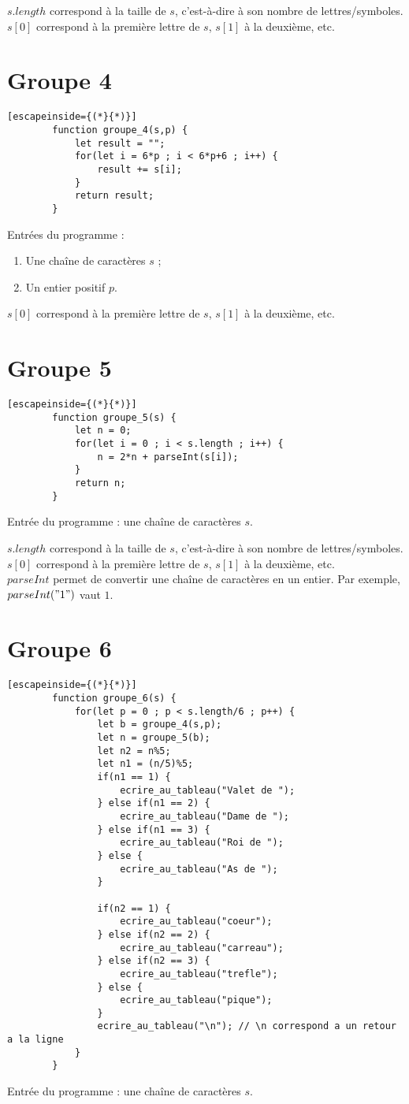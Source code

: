 \documentclass{article}
\begin{document}
	\vspace{1em}
	\noindent $s.length$ correspond à la taille de $s$, c'est-à-dire à son nombre de lettres/symboles. $s[0]$ correspond à la première lettre de $s$, $s[1]$ à la deuxième, etc.
	
	\newpage
	\section*{Groupe 4}
	\begin{lstlisting}[escapeinside={(*}{*)}]
		function groupe_4(s,p) {
			let result = "";
			for(let i = 6*p ; i < 6*p+6 ; i++) {
				result += s[i];
			}
			return result;
		}
	\end{lstlisting}
	Entrées du programme :
	\begin{enumerate}
		\item Une chaîne de caractères $s$ ;
		\item Un entier positif $p$.
	\end{enumerate}
	
	\vspace{1em}
	\noindent $s[0]$ correspond à la première lettre de $s$, $s[1]$ à la deuxième, etc.
		
	\newpage
	\section*{Groupe 5}
	\begin{lstlisting}[escapeinside={(*}{*)}]
		function groupe_5(s) {
			let n = 0;
			for(let i = 0 ; i < s.length ; i++) {
				n = 2*n + parseInt(s[i]);
			}
			return n;
		}
	\end{lstlisting}
	Entrée du programme : une chaîne de caractères $s$.
	
	\vspace{1em}
	\noindent $s.length$ correspond à la taille de $s$, c'est-à-dire à son nombre de lettres/symboles. $s[0]$ correspond à la première lettre de $s$, $s[1]$ à la deuxième, etc.\\
	$parseInt$ permet de convertir une chaîne de caractères en un entier. Par exemple, $parseInt("1")$ vaut $1$.
	
	
	\newpage
	\section*{Groupe 6}
	\begin{lstlisting}[escapeinside={(*}{*)}]
		function groupe_6(s) {
			for(let p = 0 ; p < s.length/6 ; p++) {
				let b = groupe_4(s,p);
				let n = groupe_5(b);
				let n2 = n%5;
				let n1 = (n/5)%5;
				if(n1 == 1) {
					ecrire_au_tableau("Valet de ");
				} else if(n1 == 2) {
					ecrire_au_tableau("Dame de ");
				} else if(n1 == 3) {
					ecrire_au_tableau("Roi de ");
				} else {
					ecrire_au_tableau("As de ");
				}
		
				if(n2 == 1) {
					ecrire_au_tableau("coeur");
				} else if(n2 == 2) {
					ecrire_au_tableau("carreau");
				} else if(n2 == 3) {
					ecrire_au_tableau("trefle");
				} else {
					ecrire_au_tableau("pique");
				}
				ecrire_au_tableau("\n"); // \n correspond a un retour a la ligne
			}
		}
	\end{lstlisting}
	Entrée du programme : une chaîne de caractères $s$.
	
\end{document}
